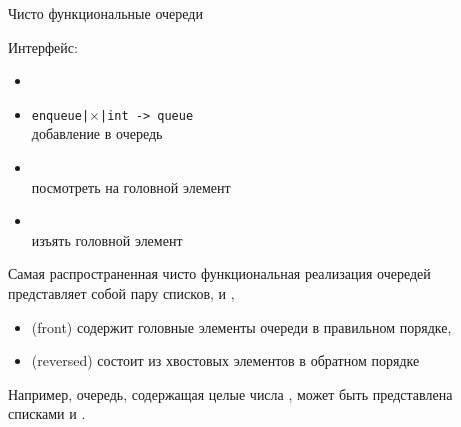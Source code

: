 \begin{frame}{Чисто функциональные очереди}
\begin{minipage}{.4\textwidth}
Интерфейс:
\begin{itemize}
\item {}
\item \texttt{enqueue|$\times$|int -> queue}\\
добавление в очередь
\item {}\\
посмотреть на головной элемент
\item {}\\
изъять головной элемент
\end{itemize}
\end{minipage}
\begin{minipage}{.55\textwidth}
  Самая распространенная чисто функциональная реализация очередей
  представляет собой пару списков,  и , 
  \begin{itemize}
  \item {} (front) содержит головные элементы очереди в правильном порядке,
  \item {} (reversed) состоит из хвостовых элементов в обратном порядке
  \end{itemize}
  \vspace{1em}
  
  Например, очередь, содержащая целые числа , может быть
  представлена списками  и
  .
\end{minipage}
\end{frame}


%


